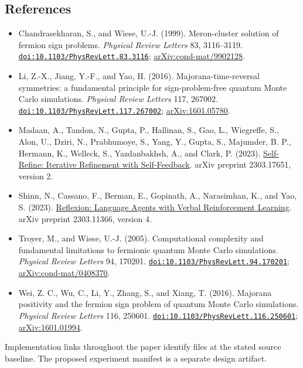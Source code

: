 \documentclass[
  11pt,
]{article}
\providecommand{\tightlist}{%
  \setlength{\itemsep}{0pt}\setlength{\parskip}{0pt}}
\begin{document}
\subsection{References}\label{references}

\begin{itemize}
\tightlist
\item
  Chandrasekharan, S., and Wiese, U.-J. (1999). Meron-cluster solution
  of fermion sign problems. \emph{Physical Review Letters} 83,
  3116--3119.
  \href{https://doi.org/10.1103/PhysRevLett.83.3116}{\nolinkurl{doi:10.1103/PhysRevLett.83.3116}};
  \href{https://arxiv.org/abs/cond-mat/9902128}{arXiv:cond-mat/9902128}.
\item
  Li, Z.-X., Jiang, Y.-F., and Yao, H. (2016). Majorana-time-reversal
  symmetries: a fundamental principle for sign-problem-free quantum
  Monte Carlo simulations. \emph{Physical Review Letters} 117, 267002.
  \href{https://doi.org/10.1103/PhysRevLett.117.267002}{\nolinkurl{doi:10.1103/PhysRevLett.117.267002}};
  \href{https://arxiv.org/abs/1601.05780}{arXiv:1601.05780}.
\item
  Madaan, A., Tandon, N., Gupta, P., Hallinan, S., Gao, L., Wiegreffe,
  S., Alon, U., Dziri, N., Prabhumoye, S., Yang, Y., Gupta, S.,
  Majumder, B. P., Hermann, K., Welleck, S., Yazdanbakhsh, A., and
  Clark, P. (2023).
  \href{https://arxiv.org/abs/2303.17651v2}{Self-Refine: Iterative
  Refinement with Self-Feedback}. arXiv preprint 2303.17651, version 2.
\item
  Shinn, N., Cassano, F., Berman, E., Gopinath, A., Narasimhan, K., and
  Yao, S. (2023). \href{https://arxiv.org/abs/2303.11366v4}{Reflexion:
  Language Agents with Verbal Reinforcement Learning}. arXiv preprint
  2303.11366, version 4.
\item
  Troyer, M., and Wiese, U.-J. (2005). Computational complexity and
  fundamental limitations to fermionic quantum Monte Carlo simulations.
  \emph{Physical Review Letters} 94, 170201.
  \href{https://doi.org/10.1103/PhysRevLett.94.170201}{\nolinkurl{doi:10.1103/PhysRevLett.94.170201}};
  \href{https://arxiv.org/abs/cond-mat/0408370}{arXiv:cond-mat/0408370}.
\item
  Wei, Z. C., Wu, C., Li, Y., Zhang, S., and Xiang, T. (2016). Majorana
  positivity and the fermion sign problem of quantum Monte Carlo
  simulations. \emph{Physical Review Letters} 116, 250601.
  \href{https://doi.org/10.1103/PhysRevLett.116.250601}{\nolinkurl{doi:10.1103/PhysRevLett.116.250601}};
  \href{https://arxiv.org/abs/1601.01994}{arXiv:1601.01994}.
\end{itemize}

Implementation links throughout the paper identify files at the stated
source baseline. The proposed experiment manifest is a separate design
artifact.
\end{document}
